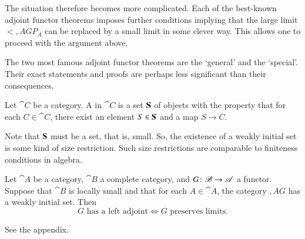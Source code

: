 The situation therefore becomes more complicated.  Each of the best-known
adjoint functor theorems imposes further conditions implying that the large
limit $\lt{\comma{A}{G}} P_A$ can be replaced by a small limit in some
clever way.  This allows one to proceed with the argument above.%
%
%
%

The two most famous adjoint functor theorems are the `general' and the
`special'.  Their exact statements and proofs are perhaps less significant
than their consequences.

\begin{defn}
Let $\cat{C}$ be a category.  A  in $\cat{C}$ is a set $\mathbf{S}$ of objects with the property
that for each $C \in \cat{C}$, there exist an element $S \in \mathbf{S}$ and
a map $S \to C$.
\end{defn}
%
Note that $\mathbf{S}$ must be a set, that is, small.  So, the existence of a
weakly initial set is some kind of size restriction.  Such size
restrictions are comparable to finiteness conditions in algebra.

\begin{thm}
\label{thm:gaft}
%
%
%
Let $\cat{A}$ be a category, $\cat{B}$ a complete category, and $G\from
\cat{B} \to \cat{A}$ a functor.  Suppose that $\cat{B}$ is locally small and
that for each $A \in \cat{A}$, the category $\comma{A}{G}$ has a weakly
initial set.  Then
\[
G \text{ has a left adjoint}
\iff
G \text{ preserves limits}.
\]
\end{thm}

\begin{pf}
See the appendix.
\end{pf}

